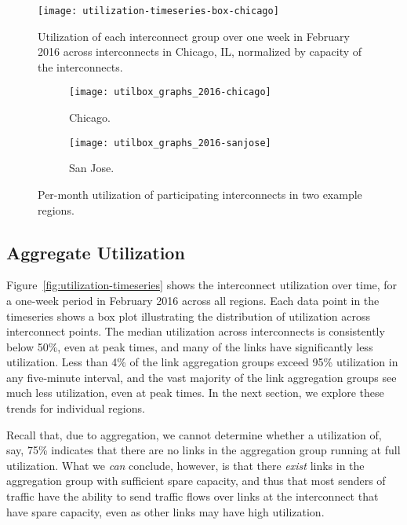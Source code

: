 \begin{figure}[t]
\texttt{[image: utilization-timeseries-box-chicago]}
\caption{Utilization of each interconnect group over one week in
  February 2016 across
  interconnects in Chicago, IL, normalized by
  capacity of the interconnects.} 
\label{fig:utilization-timeseries-chicago}
\end{figure}


\begin{figure}[t!]
\begin{minipage}{1\linewidth}
\begin{subfigure}[b]{\linewidth}
\texttt{[image: utilbox\_graphs\_2016-chicago]}
\caption{Chicago.\label{fig:utilization-per-month-chicago}}
\end{subfigure} \hfill
%
\begin{subfigure}[b]{\linewidth}
\texttt{[image: utilbox\_graphs\_2016-sanjose]}
\caption{San Jose.\label{fig:utilization-per-month-sanjose}}
\end{subfigure}
\end{minipage}
\caption{Per-month utilization of participating interconnects in two
  example regions.}
\label{fig:utilization-per-month-compare}
\end{figure}

\subsection{Aggregate Utilization}

Figure~\ref{fig:utilization-timeseries} shows the
interconnect utilization over time, for a one-week period in
February 2016 across all regions. Each data point in the timeseries
shows a box plot illustrating the distribution of utilization
across interconnect points. The median utilization across interconnects
is consistently below 50\%, even at peak times, and many of the links
have significantly less utilization.  Less than 4\% of the link aggregation groups exceed 95\%
utilization in any five-minute interval, and the vast majority of the
link aggregation groups see much less utilization, even at peak
times. In the next section, we explore these trends for individual
regions. 

Recall that, due to aggregation, we cannot determine whether a
utilization of, say, 75\% indicates that there are no links in the
aggregation group running at full utilization. What we {\em can}
conclude, however, is that there {\em exist} links in the aggregation
group with sufficient spare capacity, and thus that most senders of
traffic have the ability to send traffic flows over links at the
interconnect that have spare capacity, even as other links may have high
utilization. 

